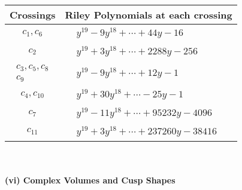 \documentclass[1p]{elsarticle_modified}
\theoremstyle{definition}
\begin{document}
\begin{tabular}{m{50pt}|m{274pt}}
Crossings & \hspace{64pt}Riley Polynomials at each crossing \\
\hline $$\begin{aligned}c_{1},c_{6}\end{aligned}$$&$\begin{aligned}
&y^{19}-9 y^{18}+\cdots+44 y-16
\end{aligned}$\\
\hline $$\begin{aligned}c_{2}\end{aligned}$$&$\begin{aligned}
&y^{19}+3 y^{18}+\cdots+2288 y-256
\end{aligned}$\\
\hline $$\begin{aligned}c_{3},c_{5},c_{8}\\c_{9}\end{aligned}$$&$\begin{aligned}
&y^{19}-9 y^{18}+\cdots+12 y-1
\end{aligned}$\\
\hline $$\begin{aligned}c_{4},c_{10}\end{aligned}$$&$\begin{aligned}
&y^{19}+30 y^{18}+\cdots-25 y-1
\end{aligned}$\\
\hline $$\begin{aligned}c_{7}\end{aligned}$$&$\begin{aligned}
&y^{19}-11 y^{18}+\cdots+95232 y-4096
\end{aligned}$\\
\hline $$\begin{aligned}c_{11}\end{aligned}$$&$\begin{aligned}
&y^{19}+3 y^{18}+\cdots+237260 y-38416
\end{aligned}$\\
\hline
\end{tabular}\\~\\
\newpage\flushleft \textbf{(vi) Complex Volumes and Cusp Shapes}
\end{document}
